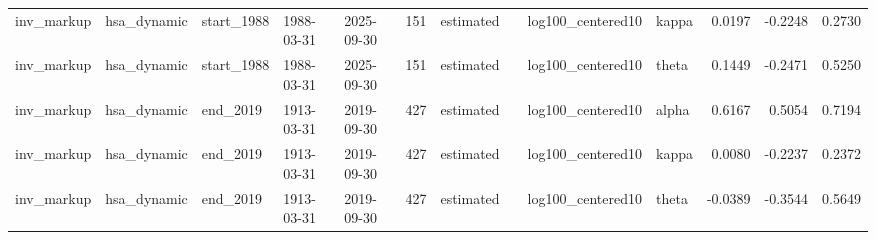 \begin{tabular}{lllllrllllrrr}
inv\_markup & hsa\_dynamic & start\_1988 & 1988-03-31 & 2025-09-30 & 151 & estimated &  & log100\_centered10 & kappa & 0.0197 & -0.2248 & 0.2730 \\
inv\_markup & hsa\_dynamic & start\_1988 & 1988-03-31 & 2025-09-30 & 151 & estimated &  & log100\_centered10 & theta & 0.1449 & -0.2471 & 0.5250 \\
inv\_markup & hsa\_dynamic & end\_2019 & 1913-03-31 & 2019-09-30 & 427 & estimated &  & log100\_centered10 & alpha & 0.6167 & 0.5054 & 0.7194 \\
inv\_markup & hsa\_dynamic & end\_2019 & 1913-03-31 & 2019-09-30 & 427 & estimated &  & log100\_centered10 & kappa & 0.0080 & -0.2237 & 0.2372 \\
inv\_markup & hsa\_dynamic & end\_2019 & 1913-03-31 & 2019-09-30 & 427 & estimated &  & log100\_centered10 & theta & -0.0389 & -0.3544 & 0.5649 \\
\bottomrule
\end{tabular}

